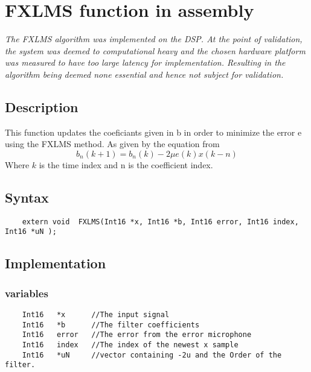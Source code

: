 
\section{FXLMS function in assembly}

\textit{The FXLMS algorithm was implemented on the DSP. At the point of validation, the system was deemed to computational heavy and the chosen hardware platform was measured to have too large latency for implementation. Resulting in the algorithm being deemed none essential and hence not subject for validation.} 

\subsection{Description}
This function updates the coeficiants given in b in order to minimize the error e using the FXLMS method. As given by the equation from 
\begin{equation}
	b_n(k+1)=b_n(k)-2\mu e(k)x(k-n)
\end{equation}
Where $k$ is the time index and n is the coefficient index.

\subsection{Syntax} 
\begin{lstlisting}
	extern void  FXLMS(Int16 *x, Int16 *b, Int16 error, Int16 index, Int16 *uN );
\end{lstlisting}

\subsection{Implementation}

\subsubsection{variables}
\begin{lstlisting}
	Int16 	*x 		//The input signal
	Int16	*b		//The filter coefficients
	Int16	error	//The error from the error microphone
	Int16	index	//The index of the newest x sample
	Int16	*uN		//vector containing -2u and the Order of the filter.
\end{lstlisting}

